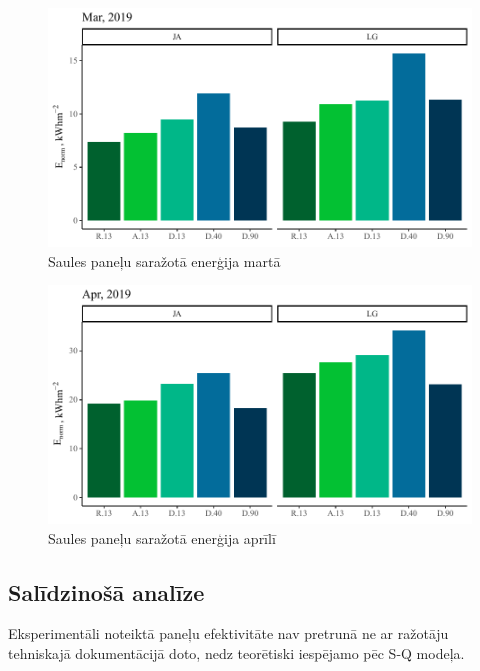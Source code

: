 \begin{figure}[h]
    \centering
    \includegraphics[width=\linewidth]{figures/sol_month/mar_m_m2.pdf}
    \caption{Saules paneļu saražotā enerģija martā}
    \label{fig:mar_sum}
\end{figure}

\begin{figure}[h]
    \centering
    \includegraphics[width=\linewidth]{figures/sol_month/apr_m_m2.pdf}
    \caption{Saules paneļu saražotā enerģija aprīlī}
    \label{fig:apr_sum}
\end{figure}


\subsection{Salīdzinošā analīze}\label{subsection:effectivity}

Eksperimentāli noteiktā paneļu efektivitāte nav pretrunā ne ar ražotāju tehniskajā dokumentācijā doto, nedz teorētiski iespējamo pēc S-Q modeļa. 

